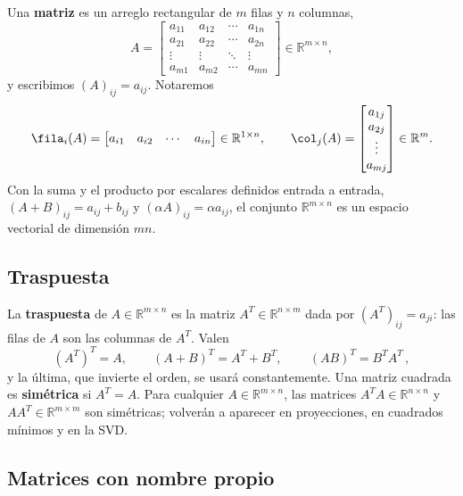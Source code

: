 Una \textbf{matriz} es un arreglo rectangular de $m$ filas y $n$ columnas,
\[
A =
\begin{bmatrix}
a_{11} & a_{12} & \cdots & a_{1n} \\
a_{21} & a_{22} & \cdots & a_{2n} \\
\vdots & \vdots & \ddots & \vdots \\
a_{m1} & a_{m2} & \cdots & a_{mn}
\end{bmatrix} \in \mathbb{R}^{m \times n},
\]
y escribimos $(A)_{ij} = a_{ij}$. Notaremos
\[
\fila_i(A) = \begin{bmatrix} a_{i1} & a_{i2} & \cdots & a_{in}\end{bmatrix}
\in\mathbb{R}^{1\times n},
\qquad
\col_j(A) = \begin{bmatrix} a_{1j} \\ a_{2j} \\ \vdots \\ a_{mj}\end{bmatrix}
\in\mathbb{R}^{m}.
\]
Con la suma y el producto por escalares definidos entrada a entrada,
$(A+B)_{ij} = a_{ij}+b_{ij}$ y $(\alpha A)_{ij} = \alpha a_{ij}$, el conjunto
$\mathbb{R}^{m\times n}$ es un espacio vectorial de dimensión $mn$.

\subsection{Traspuesta}

La \textbf{traspuesta} de $A\in\mathbb{R}^{m\times n}$ es la matriz
$A^T\in\mathbb{R}^{n\times m}$ dada por $(A^T)_{ij} = a_{ji}$: las filas de $A$
son las columnas de $A^T$. Valen
\[
(A^T)^T = A,
\qquad
(A+B)^T = A^T+B^T,
\qquad
\boxed{\,(AB)^T = B^T A^T\,},
\]
y la última, que invierte el orden, se usará constantemente. Una matriz cuadrada
es \textbf{simétrica} si $A^T = A$. Para cualquier $A\in\mathbb{R}^{m\times n}$,
las matrices $A^TA\in\mathbb{R}^{n\times n}$ y $AA^T\in\mathbb{R}^{m\times m}$
son simétricas; volverán a aparecer en proyecciones, en cuadrados mínimos y en
la SVD.

\subsection{Matrices con nombre propio}

